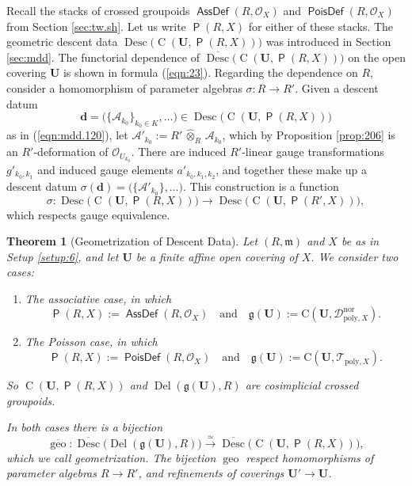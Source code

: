\documentclass[a4paper, 10pt]{amsart}
\newtheorem{thm}[equation]{Theorem}
\theoremstyle{definition}
\numberwithin{equation}{section}
\newcommand{\iso}{\xrightarrow{\simeq}}
\newcommand{\opn}{\operatorname}
\newcommand{\cat}[1]{\operatorname{\mathsf{#1}}}
\newcommand{\ol}{\overline}
\newcommand{\mfrak}[1]{\mathfrak{#1}}
\newcommand{\mcal}[1]{\mathcal{#1}}
\newcommand{\mrm}[1]{\mathrm{#1}}
\newcommand{\tup}[1]{\textup{#1}}
\newcommand{\bsym}[1]{\boldsymbol{#1}}
\newcommand{\hatotimes}[1]{\, \what{{\otimes}}_{#1} \,}
\newcommand{\what}[1]{\widehat{#1}}
\newcommand{\g}{\mfrak{g}}
\newcommand{\m}{\mfrak{m}}
\newcommand{\twocat}[1]{\operatorname{\bsym{\cat{#1}}}}
\begin{document}
Recall the stacks of crossed groupoids $\twocat{AssDef}(R, \mcal{O}_X)$ 
and $\twocat{PoisDef}(R, \mcal{O}_X)$ from Section \ref{sec:tw.sh}.
Let us write $\twocat{P}(R, X)$ for either of these stacks. 
The geometric descent data 
$\opn{Desc} \bigl( \opn{C}(\bsym{U}, \twocat{P}(R, X)) \bigr)$ was introduced in
Section \ref{sec:mdd}. The functorial dependence of 
$\ol{\opn{Desc}} \bigl( \opn{C}(\bsym{U}, \twocat{P}(R, X)) \bigr)$ on
the open covering $\bsym{U}$ is shown in
formula (\ref{eqn:23}). Regarding the dependence on $R$, consider a
homomorphism of parameter algebras $\sigma : R \to R'$.
Given a descent datum 
\[ \bsym{d} = \bigl( \{ \mcal{A}_{k_0} \}_{k_0 \in K}, \ldots \bigr) \in
\opn{Desc} \bigl( \opn{C}(\bsym{U}, \twocat{P}(R, X)) \bigr) \]
as in (\ref{eqn:mdd.120}),
let $\mcal{A}'_{k_0} := R' \hatotimes{R} \mcal{A}_{k_0}$, which by 
Proposition \ref{prop:206} is an
$R'$-deformation of $\mcal{O}_{U_{k_0}}$.
There are induced $R'$-linear gauge transformations
$g'_{k_0, k_1}$ and induced gauge elements
$a'_{k_0, k_1, k_2}$, and together these make up a descent datum
$\sigma(\bsym{d}) =  \bigl( \{ \mcal{A}'_{k_0} \}, \ldots \bigr)$.
This construction is a function
\begin{equation} \label{eqn:24}
\sigma : \opn{Desc} \bigl( \opn{C}(\bsym{U}, \twocat{P}(R, X)) \bigr)
\to \opn{Desc} \bigl( \opn{C}(\bsym{U} , \twocat{P}(R', X)) \bigr) , 
\end{equation}
which respects gauge equivalence.

\begin{thm}[Geometrization of Descent Data] \label{thm:11}
Let $(R, \m)$ and $X$ be as in Setup \tup{\ref{setup:6}}, and let
$\bsym{U}$ be a finite affine open covering of $X$.
We consider two cases\tup{:}
\begin{enumerate}
\item[$\vartriangleright$] The associative case, in which 
\[ \twocat{P}(R, X) := \twocat{AssDef}(R, \mcal{O}_X) \quad
\text{and} \quad
\g(\bsym{U}) := \mrm{C}(\bsym{U}, 
\mcal{D}_{\mrm{poly}, X}^{\mrm{nor}})
. \] 
%
\item[$\vartriangleright$] The Poisson case, in which 
\[ \twocat{P}(R, X) := \twocat{PoisDef}(R, \mcal{O}_X) \quad
\text{and} \quad
\g(\bsym{U}) := \mrm{C}(\bsym{U}, \mcal{T}_{\mrm{poly}, X}) . \] 
\end{enumerate}
So $\opn{C}(\bsym{U} , \twocat{P}(R, X))$
and 
$\opn{Del}(\g(\bsym{U}) , R)$ are cosimplicial crossed groupoids. 

In both cases there is a bijection
\[  \ol{\opn{geo}} : 
\ol{\opn{Desc}} \bigl( \opn{Del}(\g(\bsym{U}) , R) \bigr)
\iso
\ol{\opn{Desc}} \bigl( \opn{C}(\bsym{U} , \twocat{P}(R, X)) \bigr) , \]
which we call {\em geometrization}. The bijection $\opn{geo}$ respect
homomorphisms of parameter algebras $R \to R'$, and
refinements of coverings $\bsym{U}' \to \bsym{U}$.
\end{thm}
\end{document}
